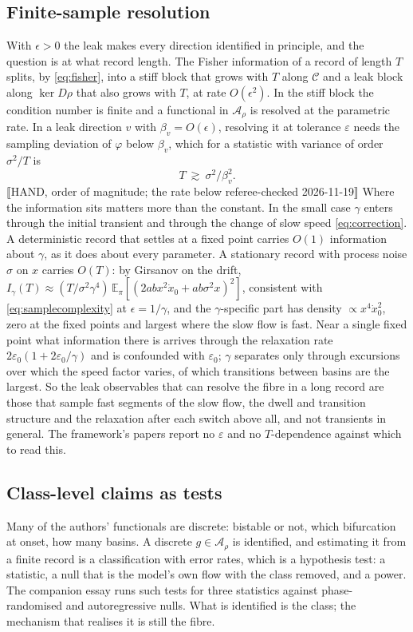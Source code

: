 \documentclass[10pt]{article}
\begin{document}
\subsection{Finite-sample resolution}
With $\epsilon>0$ the leak makes every direction identified in principle, and the question is at what record length. The Fisher information of a record of length $T$ splits, by \eqref{eq:fisher}, into a stiff block that grows with $T$ along $\mathcal{C}$ and a leak block along $\ker D\rho$ that also grows with $T$, at rate $O(\epsilon^2)$. In the stiff block the condition number is finite and a functional in $\mathcal{A}_\rho$ is resolved at the parametric rate. In a leak direction $v$ with $\beta_v=O(\epsilon)$, resolving it at tolerance $\varepsilon$ needs the sampling deviation of $\varphi$ below $\beta_v$, which for a statistic with variance of order $\sigma^2/T$ is
\begin{equation}
T\ \gtrsim\ \sigma^2/\beta_v^{2}. \tag{heuristic}
\label{eq:samplecomplexity}
\end{equation}
⟦HAND, order of magnitude; the rate below referee-checked 2026-11-19⟧ Where the information sits matters more than the constant. In the small case $\gamma$ enters through the initial transient and through the change of slow speed \eqref{eq:correction}. A deterministic record that settles at a fixed point carries $O(1)$ information about $\gamma$, as it does about every parameter. A stationary record with process noise $\sigma$ on $x$ carries $O(T)$: by Girsanov on the drift, $I_\gamma(T)\approx (T/\sigma^2\gamma^4)\,\mathbb{E}_\pi[(2abx^2\dot x_0+ab\sigma^2x)^2]$, consistent with \eqref{eq:samplecomplexity} at $\epsilon=1/\gamma$, and the $\gamma$-specific part has density $\propto x^4\dot x_0^2$, zero at the fixed points and largest where the slow flow is fast. Near a single fixed point what information there is arrives through the relaxation rate $2\varepsilon_0(1+2\varepsilon_0/\gamma)$ and is confounded with $\varepsilon_0$; $\gamma$ separates only through excursions over which the speed factor varies, of which transitions between basins are the largest. So the leak observables that can resolve the fibre in a long record are those that sample fast segments of the slow flow, the dwell and transition structure and the relaxation after each switch above all, and not transients in general. The framework's papers report no $\varepsilon$ and no $T$-dependence against which to read this.

\subsection{Class-level claims as tests}
Many of the authors' functionals are discrete: bistable or not, which bifurcation at onset, how many basins. A discrete $g\in\mathcal{A}_\rho$ is identified, and estimating it from a finite record is a classification with error rates, which is a hypothesis test: a statistic, a null that is the model's own flow with the class removed, and a power. The companion essay runs such tests for three statistics against phase-randomised and autoregressive nulls. What is identified is the class; the mechanism that realises it is still the fibre.
\end{document}
